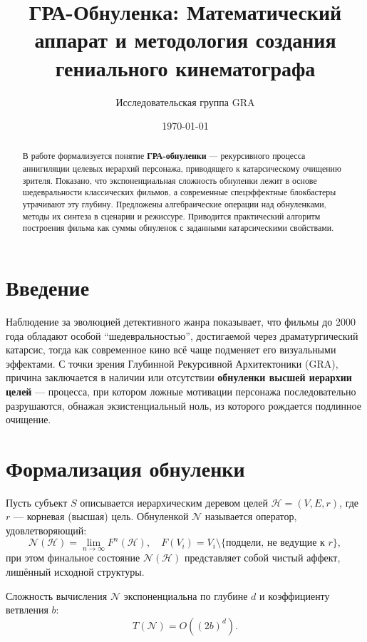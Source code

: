 \documentclass[12pt,a4paper]{article}
\title{ГРА-Обнуленка: Математический аппарат и методология создания гениального кинематографа}
\author{Исследовательская группа GRA}
\date{\today}
\begin{document}
\maketitle

\begin{abstract}
В работе формализуется понятие \textbf{ГРА-обнуленки} --- рекурсивного процесса аннигиляции целевых иерархий персонажа, приводящего к катарсическому очищению зрителя. Показано, что экспоненциальная сложность обнуленки лежит в основе шедевральности классических фильмов, а современные спецэффектные блокбастеры утрачивают эту глубину. Предложены алгебраические операции над обнуленками, методы их синтеза в сценарии и режиссуре. Приводится практический алгоритм построения фильма как суммы обнуленок с заданными катарсическими свойствами.
\end{abstract}

\section{Введение}
Наблюдение за эволюцией детективного жанра показывает, что фильмы до 2000 года обладают особой ``шедевральностью'', достигаемой через драматургический катарсис, тогда как современное кино всё чаще подменяет его визуальными эффектами. С точки зрения Глубинной Рекурсивной Архитектоники (GRA), причина заключается в наличии или отсутствии \textbf{обнуленки высшей иерархии целей} --- процесса, при котором ложные мотивации персонажа последовательно разрушаются, обнажая экзистенциальный ноль, из которого рождается подлинное очищение.

\section{Формализация обнуленки}
Пусть субъект $S$ описывается иерархическим деревом целей $\mathcal{H} = (V, E, r)$, где $r$ --- корневая (высшая) цель. Обнуленкой $\mathcal{N}$ называется оператор, удовлетворяющий:
\[
\mathcal{N}(\mathcal{H}) = \lim_{n\to\infty} F^n(\mathcal{H}),\quad F(V_i) = V_i \setminus \{\text{подцели, не ведущие к } r\},
\]
при этом финальное состояние $\mathcal{N}(\mathcal{H})$ представляет собой чистый аффект, лишённый исходной структуры.

Сложность вычисления $\mathcal{N}$ экспоненциальна по глубине $d$ и коэффициенту ветвления $b$:
\[
T(\mathcal{N}) = O((2b)^d).
\]
\end{document}
